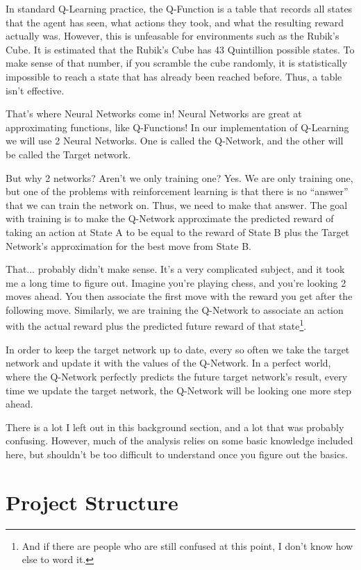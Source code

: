 \documentclass[12pt]{article}
\begin{document}
In standard Q-Learning practice, the Q-Function is a table that records all states that the agent has seen, what actions they took, and what the resulting reward actually was. However, this is unfeasable for environments such as the Rubik's Cube. It is estimated that the Rubik's Cube has 43 Quintillion possible states. To make sense of that number, if you scramble the cube randomly, it is statistically impossible to reach a state that has already been reached before. Thus, a table isn't effective.

That's where Neural Networks come in! Neural Networks are great at approximating functions, like Q-Functions! In our implementation of Q-Learning we will use 2 Neural Networks. One is called the Q-Network, and the other will be called the Target network.

But why 2 networks? Aren't we only training one? Yes. We are only training one, but one of the problems with reinforcement learning is that there is no ``answer'' that we can train the network on. Thus, we need to make that answer. The goal with training is to make the Q-Network approximate the predicted reward of taking an action at State A to be equal to the reward of State B plus the Target Network's approximation for the best move from State B.

That... probably didn't make sense. It's a very complicated subject, and it took me a long time to figure out. Imagine you're playing chess, and you're looking 2 moves ahead. You then associate the first move with the reward you get after the following move. Similarly, we are training the Q-Network to associate an action with the actual reward plus the predicted future reward of that state\footnote{And if there are people who are still confused at this point, I don't know how else to word it.}.

In order to keep the target network up to date, every so often we take the target network and update it with the values of the Q-Network. In a perfect world, where the Q-Network perfectly predicts the future target network's result, every time we update the target network, the Q-Network will be looking one more step ahead.

There is a lot I left out in this background section, and a lot that was probably confusing. However, much of the analysis relies on some basic knowledge included here, but shouldn't be too difficult to understand once you figure out the basics.


\newpage

\section{Project Structure}
\end{document}
